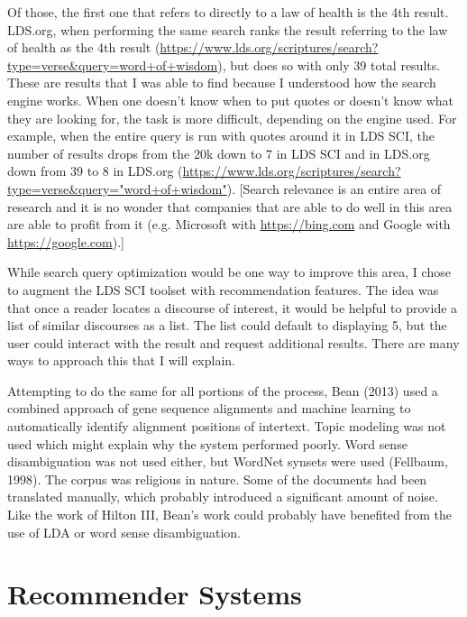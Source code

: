 Of those, the first one that refers to directly to a law of health is the 4th result. LDS.org, when performing the same search ranks the result referring to the law of health as the 4th result (\url{https://www.lds.org/scriptures/search?type=verse&query=word+of+wisdom}), but does so with only 39 total results. These are results that I was able to find because I understood how the search engine works. When one doesn’t know when to put quotes or doesn’t know what they are looking for, the task is more difficult, depending on the engine used. For example, when the entire query is run with quotes around it in LDS SCI, the number of results drops from the 20k down to 7 in LDS SCI and in LDS.org down from 39 to 8 in LDS.org (\url{https://www.lds.org/scriptures/search?type=verse&query="word+of+wisdom"}). [Search relevance is an entire area of research and it is no wonder that companies that are able to do well in this area are able to profit from it (e.g. Microsoft with \url{https://bing.com} and Google with \url{https://google.com}).]

While search query optimization would be one way to improve this area, I chose to augment the LDS SCI toolset with recommendation features. The idea was that once a reader locates a discourse of interest, it would be helpful to provide a list of similar discourses as a list. The list could default to displaying 5, but the user could interact with the result and request additional results. There are many ways to approach this that I will explain.

Attempting to do the same for all portions of the process, Bean (2013) used a combined approach of gene sequence alignments and machine learning to automatically identify alignment positions of intertext. Topic modeling was not used which might explain why the system performed poorly. Word sense disambiguation was not used either, but WordNet synsets were used (Fellbaum, 1998). The corpus was religious in nature. Some of the documents had been translated manually, which probably introduced a significant amount of noise. Like the work of Hilton III, Bean’s work could probably have benefited from the use of LDA or word sense disambiguation.

\section{Recommender Systems}

